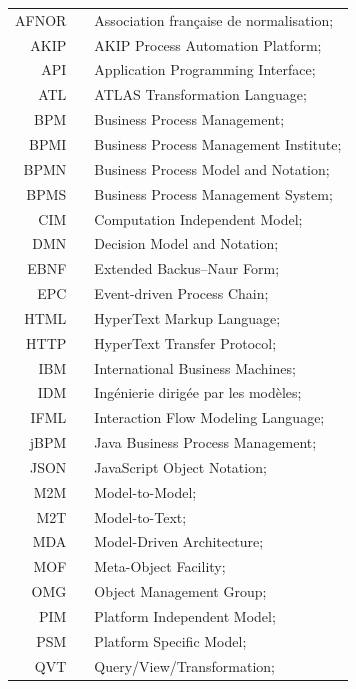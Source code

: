 \begin{center}
    \setlength{\tabcolsep}{3pt}
    \renewcommand{\arraystretch}{0.92}
    \begin{tabular}[t]{rp{3mm}p{12cm}}
        AFNOR & & Association française de normalisation;\\
        AKIP & & AKIP Process Automation Platform;\\
        API & & Application Programming Interface;\\
        ATL & & ATLAS Transformation Language;\\
        BPM & & Business Process Management;\\
        BPMI & & Business Process Management Institute;\\
        BPMN & & Business Process Model and Notation;\\
        BPMS & & Business Process Management System;\\
        CIM & & Computation Independent Model;\\
        DMN & & Decision Model and Notation;\\
        EBNF & & Extended Backus--Naur Form;\\
        EPC & & Event-driven Process Chain;\\
        HTML & & HyperText Markup Language;\\
        HTTP & & HyperText Transfer Protocol;\\
        IBM & & International Business Machines;\\
        IDM & & Ingénierie dirigée par les modèles;\\
        IFML & & Interaction Flow Modeling Language;\\
        jBPM & & Java Business Process Management;\\
        JSON & & JavaScript Object Notation;\\
        M2M & & Model-to-Model;\\
        M2T & & Model-to-Text;\\
        MDA & & Model-Driven Architecture;\\
        MOF & & Meta-Object Facility;\\
        OMG & & Object Management Group;\\
        PIM & & Platform Independent Model;\\
        PSM & & Platform Specific Model;\\
        QVT & & Query/View/Transformation;\\

\end{tabular}
\end{center}
